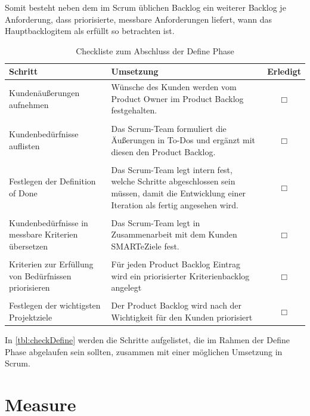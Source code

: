         Somit besteht neben dem im Scrum üblichen Backlog ein weiterer Backlog je Anforderung, dass priorisierte, messbare Anforderungen liefert, wann das Hauptbacklogitem als erfüllt so betrachten ist.

        \begin{table}
        \label{tbl:checkDefine}
        \begin{tabularx}{\textwidth}{|p{3.5cm}|X|c|}
          \hline
          Schritt & Umsetzung & Erledigt \\
          \hline
          Kundenäußerungen aufnehmen & Wünsche des Kunden werden vom Product Owner im Product Backlog festgehalten. & $\Box$ \\
          &&\\
          Kundenbedürfnisse auflisten & Das Scrum-Team formuliert die Äußerungen in To-Dos und ergänzt mit diesen den Product Backlog. & $\Box$ \\
          &&\\
          Festlegen der Definition of Done & Das Scrum-Team legt intern fest, welche Schritte abgeschlossen sein müssen, damit die Entwicklung einer Iteration als fertig angesehen wird. & $\Box$ \\
          &&\\
          Kundenbedürfnisse in messbare Kriterien übersetzen & Das Scrum-Team legt in Zusammenarbeit mit dem Kunden SMARTe\footnotemark Ziele fest. & $\Box$ \\
          &&\\
          Kriterien zur Erfüllung von Bedürfnissen priorisieren & Für jeden Product Backlog Eintrag wird ein priorisierter Kriterienbacklog angelegt & $\Box$ \\
          &&\\
          Festlegen der wichtigsten Projektziele & Der Product Backlog wird nach der Wichtigkeit für den Kunden priorisiert & $\Box$ \\
          \hline
        \end{tabularx}
        \caption{Checkliste zum Abschluss der Define Phase}
        \end{table}


        In \autoref{tbl:checkDefine} werden die Schritte aufgelistet, die im Rahmen der Define Phase abgelaufen sein sollten, zusammen mit einer möglichen Umsetzung in Scrum.

    \section{Measure}
    \label{sec:measure}

